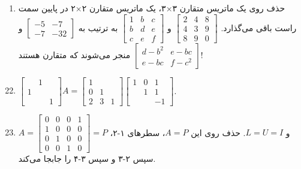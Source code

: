 \documentclass[12pt,a4paper]{article}
\begin{document}
{\begin{enumerate}
			\item حذف روی یک ماتریس متقارن ۳×۳، یک ماتریس متقارن ۲×۲ در پایین سمت راست باقی می‌گذارد.
			$\begin{bmatrix} 2 & 4 & 8 \\ 4 & 3 & 9 \\ 8 & 9 & 0 \end{bmatrix}$ و $\begin{bmatrix} 1 & b & c \\ b & d & e \\ c & e & f \end{bmatrix}$ به ترتیب به $\begin{bmatrix} -5 & -7 \\ -7 & -32 \end{bmatrix}$ و $\begin{bmatrix} d-b^2 & e-bc \\ e-bc & f-c^2 \end{bmatrix}$ منجر می‌شوند که متقارن هستند!
		\end{enumerate}
		
		
		\begin{enumerate}
			\setcounter{enumi}{21}
			\item $\begin{bmatrix} & 1 & \\ 1 & & \\ & & 1 \end{bmatrix} A = \begin{bmatrix} 1 & & \\ 0 & 1 & \\ 2 & 3 & 1 \end{bmatrix} \begin{bmatrix} 1 & 0 & 1 \\ & 1 & 1 \\ & & -1 \end{bmatrix}$.
			
			\item $A = \begin{bmatrix} 0 & 0 & 0 & 1 \\ 1 & 0 & 0 & 0 \\ 0 & 1 & 0 & 0 \\ 0 & 0 & 1 & 0 \end{bmatrix} = P$ و $L=U=I$. حذف روی این $A=P$، سطرهای ۱-۲، سپس ۲-۳ و سپس ۳-۴ را جابجا می‌کند.
			

\end{enumerate}}
\end{document}
